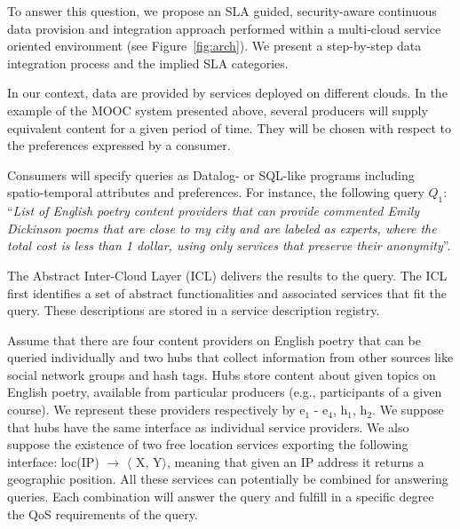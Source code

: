 To answer this question, we propose an SLA guided, security-aware continuous data provision and integration approach performed within a multi-cloud service oriented environment  (see
Figure~\ref{fig:arch}). 
We present a step-by-step data integration process and the implied  SLA categories.

In our context, data are provided by services deployed on different clouds. 
In the example of the MOOC system presented above, several producers will supply equivalent content for a given period of time. 
They will be chosen with respect to the  preferences expressed by a consumer. 

Consumers will specify queries as Datalog- or SQL-like programs including spatio-temporal attributes and preferences.
For instance, the following query $Q_1$: ``\textit{List of English poetry content providers that can provide commented Emily Dickinson poems that are close to my city and are labeled as experts, where the total cost is less than 1 dollar, using only services that preserve their anonymity}''. 

The Abstract Inter-Cloud Layer (ICL) delivers the results to the  query. 
The ICL  first identifies a set of abstract functionalities  and associated services that fit the  query. These descriptions are stored in a service description registry.

Assume that there are four content providers on English poetry that can be queried individually and two hubs that collect information from other sources like social network groups and hash tags.
Hubs  store content about given topics on  English poetry, available from particular producers (e.g., participants of a given course).
We represent these providers respectively by { e$_1$ - e$_4$}, {h$_1$}, {h$_2$}. 
We suppose that hubs  have the same interface as individual service providers.
We also suppose the existence of two free location services exporting the following interface: {loc(IP) $\rightarrow$ $\langle$ X, Y$\rangle$}, meaning that given an IP address it returns a geographic position.
All these services can potentially be combined for answering queries. Each combination will answer the query and fulfill in a specific degree the QoS requirements of the query.



